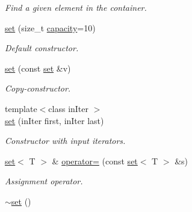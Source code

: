 \begin{DoxyCompactItemize}
\begin{DoxyCompactList}\small\item\em Find a given element in the container. \end{DoxyCompactList}\item 
\hypertarget{classmerlin_1_1set_a435150b8aca2440576d6d2d11cb17e22}{}\hyperlink{classmerlin_1_1set_a435150b8aca2440576d6d2d11cb17e22}{set} (size\+\_\+t \hyperlink{classmerlin_1_1set_ad3f6a7acc4c9bf242f7f7232e50327bc}{capacity}=10)\label{classmerlin_1_1set_a435150b8aca2440576d6d2d11cb17e22}

\begin{DoxyCompactList}\small\item\em Default constructor. \end{DoxyCompactList}\item 
\hypertarget{classmerlin_1_1set_afcc09e984c6dad4310b4dd1e53df02f0}{}\hyperlink{classmerlin_1_1set_afcc09e984c6dad4310b4dd1e53df02f0}{set} (const \hyperlink{classmerlin_1_1set}{set} \&v)\label{classmerlin_1_1set_afcc09e984c6dad4310b4dd1e53df02f0}

\begin{DoxyCompactList}\small\item\em Copy-\/constructor. \end{DoxyCompactList}\item 
\hypertarget{classmerlin_1_1set_aa945e76777e7d527be7487072029f359}{}{\footnotesize template$<$class in\+Iter $>$ }\\\hyperlink{classmerlin_1_1set_aa945e76777e7d527be7487072029f359}{set} (in\+Iter first, in\+Iter last)\label{classmerlin_1_1set_aa945e76777e7d527be7487072029f359}

\begin{DoxyCompactList}\small\item\em Constructor with input iterators. \end{DoxyCompactList}\item 
\hypertarget{classmerlin_1_1set_ab44b00506d4ba9a6209bba0dc2df7df7}{}\hyperlink{classmerlin_1_1set}{set}$<$ T $>$ \& \hyperlink{classmerlin_1_1set_ab44b00506d4ba9a6209bba0dc2df7df7}{operator=} (const \hyperlink{classmerlin_1_1set}{set}$<$ T $>$ \&s)\label{classmerlin_1_1set_ab44b00506d4ba9a6209bba0dc2df7df7}

\begin{DoxyCompactList}\small\item\em Assignment operator. \end{DoxyCompactList}\item 
\hypertarget{classmerlin_1_1set_a96d2340e84d377b1a9a8b62123e9a7c1}{}\hyperlink{classmerlin_1_1set_a96d2340e84d377b1a9a8b62123e9a7c1}{$\sim$set} ()\label{classmerlin_1_1set_a96d2340e84d377b1a9a8b62123e9a7c1}


\end{DoxyCompactItemize}
